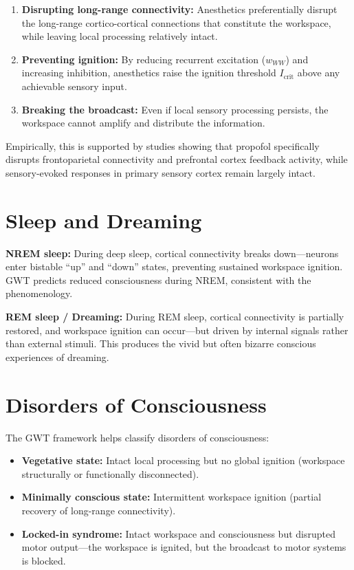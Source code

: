 \documentclass[11pt,a4paper]{report}
\begin{document}
\begin{enumerate}[leftmargin=2em]
  \item \textbf{Disrupting long-range connectivity:} Anesthetics preferentially disrupt the long-range cortico-cortical connections that constitute the workspace, while leaving local processing relatively intact.
  \item \textbf{Preventing ignition:} By reducing recurrent excitation ($w_{WW}$) and increasing inhibition, anesthetics raise the ignition threshold $I_{\text{crit}}$ above any achievable sensory input.
  \item \textbf{Breaking the broadcast:} Even if local sensory processing persists, the workspace cannot amplify and distribute the information.
\end{enumerate}

Empirically, this is supported by studies showing that propofol specifically disrupts frontoparietal connectivity and prefrontal cortex feedback activity, while sensory-evoked responses in primary sensory cortex remain largely intact.

\section{Sleep and Dreaming}

\textbf{NREM sleep:} During deep sleep, cortical connectivity breaks down---neurons enter bistable ``up'' and ``down'' states, preventing sustained workspace ignition. GWT predicts reduced consciousness during NREM, consistent with the phenomenology.

\textbf{REM sleep / Dreaming:} During REM sleep, cortical connectivity is partially restored, and workspace ignition can occur---but driven by internal signals rather than external stimuli. This produces the vivid but often bizarre conscious experiences of dreaming.

\section{Disorders of Consciousness}

The GWT framework helps classify disorders of consciousness:
\begin{itemize}[leftmargin=1.5em]
  \item \textbf{Vegetative state:} Intact local processing but no global ignition (workspace structurally or functionally disconnected).
  \item \textbf{Minimally conscious state:} Intermittent workspace ignition (partial recovery of long-range connectivity).
  \item \textbf{Locked-in syndrome:} Intact workspace and consciousness but disrupted motor output---the workspace is ignited, but the broadcast to motor systems is blocked.
\end{itemize}
\end{document}
